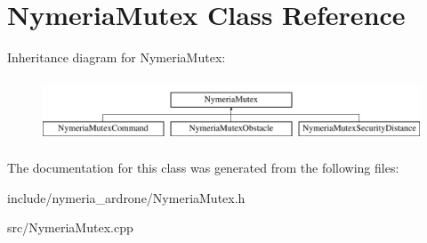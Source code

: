 \hypertarget{classNymeriaMutex}{\section{\-Nymeria\-Mutex \-Class \-Reference}
\label{classNymeriaMutex}
}
\-Inheritance diagram for \-Nymeria\-Mutex\-:\begin{figure}[H]
\begin{center}
\leavevmode
\includegraphics[height=1.895093cm]{classNymeriaMutex}
\end{center}
\end{figure}


\-The documentation for this class was generated from the following files\-:\begin{DoxyCompactItemize}
\item 
include/nymeria\-\_\-ardrone/\-Nymeria\-Mutex.\-h\item 
src/\-Nymeria\-Mutex.\-cpp\end{DoxyCompactItemize}
